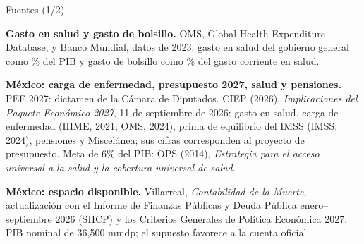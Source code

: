 \documentclass[aspectratio=169,10pt]{beamer}
\begin{document}
\begin{frame}{Fuentes (1/2)}
{  \textbf{Gasto en salud y gasto de bolsillo.} OMS, Global Health Expenditure Database, y Banco Mundial, datos de 2023: gasto en salud del gobierno general como \% del PIB y gasto de bolsillo como \% del gasto corriente en salud.\par\vspace{0.5em}
  \textbf{México: carga de enfermedad, presupuesto 2027, salud y pensiones.} PEF 2027: dictamen de la Cámara de Diputados. CIEP (2026), \emph{Implicaciones del Paquete Económico 2027}, 11 de septiembre de 2026: gasto en salud, carga de enfermedad (IHME, 2021; OMS, 2024), prima de equilibrio del IMSS (IMSS, 2024), pensiones y Miscelánea; sus cifras corresponden al proyecto de presupuesto. Meta de 6\% del PIB: OPS (2014), \emph{Estrategia para el acceso universal a la salud y la cobertura universal de salud}.\par\vspace{0.5em}
  \textbf{México: espacio disponible.} Villarreal, \emph{Contabilidad de la Muerte}, actualización con el Informe de Finanzas Públicas y Deuda Pública enero--septiembre 2026 (SHCP) y los Criterios Generales de Política Económica 2027. PIB nominal de 36,500 mmdp; el supuesto favorece a la cuenta oficial.\par}
\end{frame}
\end{document}
